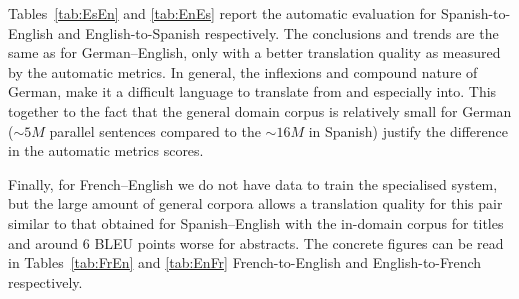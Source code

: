 \documentclass[a4paper,11pt]{article}
\begin{document}
Tables~\ref{tab:EsEn} and \ref{tab:EnEs} report the automatic evaluation for Spanish-to-English and English-to-Spanish respectively. The conclusions and trends are the same as for German--English, only with a better translation quality as measured by the automatic metrics. In general, the inflexions and compound nature of German, make it a difficult language to translate from and especially into. This together to the fact that the general domain corpus is relatively small for German ($\sim5M$ parallel sentences compared to the $\sim16M$ in Spanish) justify the difference in the automatic metrics scores.

Finally, for French--English we do not have data to train the specialised system, but the large amount of general corpora allows a translation quality for this pair similar to that obtained for Spanish--English with the in-domain corpus for titles and around 6 BLEU points worse for abstracts. The concrete figures can be read in Tables~\ref{tab:FrEn} and \ref{tab:EnFr} French-to-English and English-to-French respectively.
\end{document}
